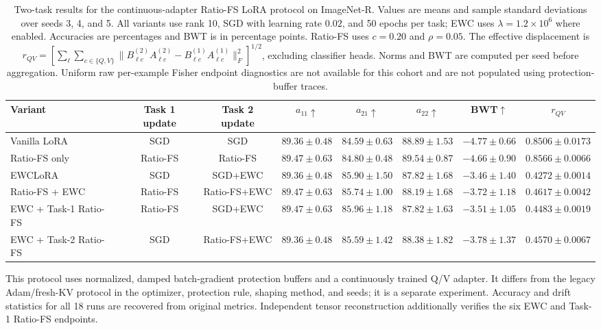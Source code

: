 \begin{table}[t]
\centering
\captionsetup{font=footnotesize,labelfont=bf}
\caption{Two-task results for the continuous-adapter Ratio-FS LoRA protocol
on ImageNet-R. Values are means and sample standard deviations over seeds 3, 4,
and 5. All variants use rank 10, SGD with learning rate $0.02$, and 50 epochs
per task; EWC uses $\lambda=1.2\times10^6$ where enabled.
Accuracies are percentages and BWT is in percentage points.
Ratio-FS uses $c=0.20$ and $\rho=0.05$.
The effective displacement is
$r_{QV}=[\sum_{\ell}\sum_{c\in\{Q,V\}}\|B^{(2)}_{\ell c}A^{(2)}_{\ell c}
-B^{(1)}_{\ell c}A^{(1)}_{\ell c}\|_F^2]^{1/2}$,
excluding classifier heads. Norms and BWT are computed per seed before
aggregation. Uniform raw per-example Fisher endpoint diagnostics are not
available for this cohort and are not populated using protection-buffer traces.}
\label{tab:two_task_lora_ratiofs}
\scriptsize
\setlength{\tabcolsep}{2.5pt}
\renewcommand{\arraystretch}{1.08}
\begin{tabular*}{\textwidth}{@{\extracolsep{\fill}}lccccccc@{}}
\toprule
Variant & Task 1 update & Task 2 update
& $a_{11}\uparrow$ & $a_{21}\uparrow$ & $a_{22}\uparrow$
& BWT$\uparrow$ & $r_{QV}$ \\
\midrule
Vanilla LoRA & SGD & SGD & $89.36\pm0.48$ & $84.59\pm0.63$ & $88.89\pm1.53$ & $-4.77\pm0.66$ & $0.8506\pm0.0173$ \\
Ratio-FS only & Ratio-FS & Ratio-FS & $89.47\pm0.63$ & $84.80\pm0.48$ & $89.54\pm0.87$ & $-4.66\pm0.90$ & $0.8566\pm0.0066$ \\
EWCLoRA & SGD & SGD+EWC & $89.36\pm0.48$ & $85.90\pm1.50$ & $87.82\pm1.68$ & $-3.46\pm1.40$ & $0.4272\pm0.0014$ \\
Ratio-FS + EWC & Ratio-FS & Ratio-FS+EWC & $89.47\pm0.63$ & $85.74\pm1.00$ & $88.19\pm1.68$ & $-3.72\pm1.18$ & $0.4617\pm0.0042$ \\
\midrule
EWC + Task-1 Ratio-FS & Ratio-FS & SGD+EWC & $89.47\pm0.63$ & $85.96\pm1.18$ & $87.82\pm1.63$ & $-3.51\pm1.05$ & $0.4483\pm0.0019$ \\
EWC + Task-2 Ratio-FS & SGD & Ratio-FS+EWC & $89.36\pm0.48$ & $85.59\pm1.42$ & $88.38\pm1.82$ & $-3.78\pm1.37$ & $0.4570\pm0.0067$ \\
\bottomrule
\end{tabular*}
\par\smallskip
\begin{minipage}{\textwidth}\scriptsize
This protocol uses normalized, damped batch-gradient protection buffers
and a continuously trained Q/V adapter.
It differs from the legacy Adam/fresh-KV protocol in the optimizer,
protection rule, shaping method, and seeds; it is a separate experiment.
Accuracy and drift statistics for all 18 runs are recovered from original
metrics. Independent tensor reconstruction additionally verifies the six
EWC and Task-1 Ratio-FS endpoints.
\end{minipage}
\end{table}
